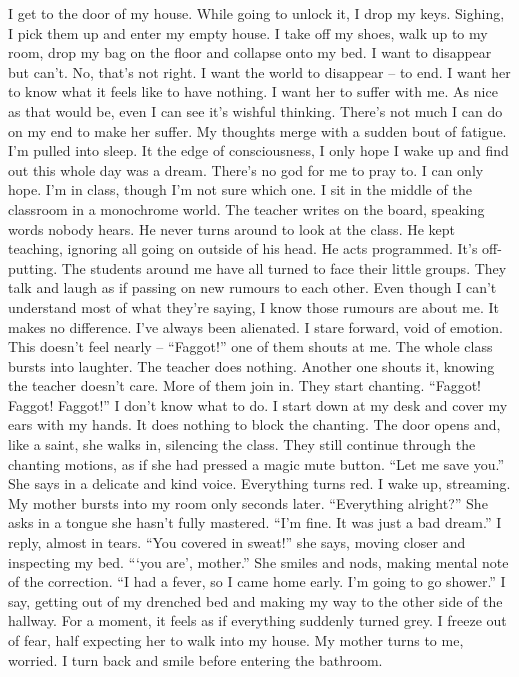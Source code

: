 \documentclass[a4paper, 12pt]{book}
\begin{document}
\begin{CJK*}{UTF8}{min}
\tab
I get to the door of my house. While going to unlock it, I drop my keys. Sighing, I pick them up and enter my empty house. I take off my shoes, walk up to my room, drop my bag on the floor and collapse onto my bed. I want to disappear but can’t. No, that’s not right. I want the world to disappear -- to end. I want her to know what it feels like to have nothing. I want her to suffer with me.
\newline
\tab
As nice as that would be, even I can see it’s wishful thinking. There’s not much I can do on my end to make her suffer. My thoughts merge with a sudden bout of fatigue. I’m pulled into sleep. It the edge of consciousness, I only hope I wake up and find out this whole day was a dream. There’s no god for me to pray to. I can only hope. 
\newline
\tab
I’m in class, though I’m not sure which one. I sit in the middle of the classroom in a monochrome world. The teacher writes on the board, speaking words nobody hears. He never turns around to look at the class. He kept teaching, ignoring all going on outside of his head. He acts programmed. It’s off-putting. The students around me have all turned to face their little groups. They talk and laugh as if passing on new rumours to each other. Even though I can’t understand most of what they’re saying, I know those rumours are about me. It makes no difference. I’ve always been alienated. I stare forward, void of emotion. This doesn’t feel nearly -- ``Faggot!'' one of them shouts at me. The whole class bursts into laughter. The teacher does nothing. Another one shouts it, knowing the teacher doesn’t care. More of them join in. They start chanting. ``Faggot! Faggot! Faggot!'' I don’t know what to do. I start down at my desk and cover my ears with my hands. It does nothing to block the chanting. The door opens and, like a saint, she walks in, silencing the class. They still continue through the chanting motions, as if she had pressed a magic mute button. ``Let me save you.'' She says in a delicate and kind voice. Everything turns red.
\newline
\tab
I wake up, streaming. My mother bursts into my room only seconds later. ``Everything alright?'' She asks in a tongue she hasn’t fully mastered.
\newline
\tab
``I’m fine. It was just a bad dream.'' I reply, almost in tears.
\newline
\tab
``You covered in sweat!'' she says, moving closer and inspecting my bed. 
\newline
\tab
```you are', mother.'' She smiles and nods, making mental note of the correction. ``I had a fever, so I came home early. I’m going to go shower.'' I say, getting out of my drenched bed and making my way to the other side of the hallway. For a moment, it feels as if everything suddenly turned grey. I freeze out of fear, half expecting her to walk into my house. My mother turns to me, worried. I turn back and smile before entering the bathroom.

\end{CJK*}
\end{document}
